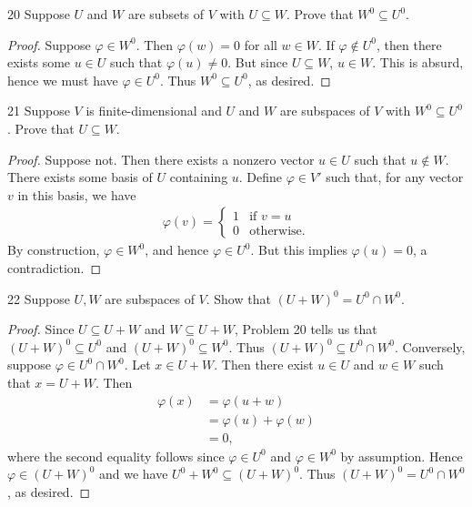 \documentclass[11pt]{extarticle}
\newenvironment{problem}[1]{\begin{prob*}{#1}{}}{\end{prob*}}
\begin{document}
\begin{problem}{20}
Suppose $U$ and $W$ are subsets of $V$ with $U\subseteq W$.  Prove that $W^0\subseteq U^0$.  
\end{problem}
\begin{proof}
Suppose $\varphi\in W^0$.  Then $\varphi(w) = 0$ for all $w\in W$.  If $\varphi\not\in U^0$, then there exists some $u\in U$ such that $\varphi(u)\neq 0$.  But since $U\subseteq W$, $u \in W$.  This is absurd, hence we must have $\varphi\in U^0$.  Thus $W^0\subseteq U^0$, as desired.  
\end{proof}

\begin{problem}{21}
Suppose $V$ is finite-dimensional and $U$ and $W$ are subspaces of $V$ with $W^0\subseteq U^0$.  Prove that $U\subseteq W$.  
\end{problem}
\begin{proof}
Suppose not.  Then there exists a nonzero vector $u\in U$ such that $u\not\in W$.  There exists some basis of $U$ containing $u$.  Define $\varphi\in V'$ such that, for any vector $v$ in this basis, we have
\begin{align*}
\varphi(v) = \begin{cases}1 &\text{if }v = u\\ 0 &\text{otherwise.}\end{cases}
\end{align*}
By construction, $\varphi\in W^0$, and hence $\varphi \in U^0$.  But this implies $\varphi(u) =0$, a contradiction.
\end{proof}

\begin{problem}{22}
Suppose $U,W$ are subspaces of $V$.  Show that $(U + W)^0=U^0\cap W^0$.  
\end{problem}
\begin{proof}
Since $U\subseteq U+W$ and $W\subseteq U + W$, Problem 20 tells us that $(U + W)^0\subseteq U^0$ and $(U+W)^0\subseteq W^0$.  Thus  $(U+W)^0\subseteq U^0\cap W^0$.  Conversely, suppose $\varphi\in U^0\cap W^0$.  Let $x \in U + W$.  Then there exist $u\in U$ and $w\in W$ such that $x = U + W$.  Then 
\begin{align*}
\varphi(x) &= \varphi(u + w)\\
&= \varphi(u) + \varphi(w)\\
&= 0,
\end{align*}  
where the second equality follows since $\varphi\in U^0$ and $\varphi\in W^0$ by assumption.  Hence $\varphi \in (U+W)^0$ and we have $U^0 + W^0 \subseteq (U+W)^0$.  Thus $(U + W)^0=U^0\cap W^0$, as desired.
\end{proof}
\end{document}
